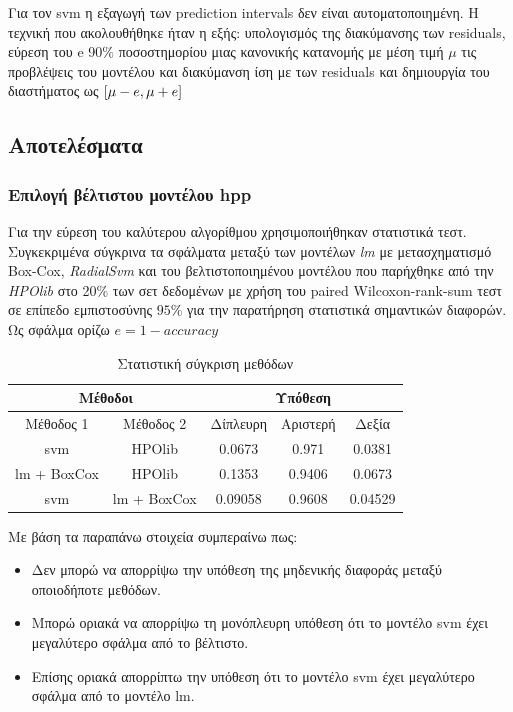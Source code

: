 \documentclass[]{article}
\numberwithin{equation}{section}		%
\numberwithin{figure}{section}			%
\numberwithin{table}{section}				%
\begin{document}
   Για τον svm η εξαγωγή των prediction intervals δεν είναι αυτοματοποιημένη. Η τεχνική που ακολουθήθηκε ήταν η εξής: υπολογισμός της διακύμανσης των residuals, εύρεση του e 90$\%$ ποσοστημορίου μιας κανονικής κατανομής με μέση τιμή $\mu$ τις προβλέψεις του μοντέλου και διακύμανση ίση με των residuals και δημιουργία του διαστήματος ως $ \interval{\mu - e}{\mu + e}$
   
   \subsection{Αποτελέσματα}
   \subsubsection{Επιλογή βέλτιστου μοντέλου \gls{hpp}}
   Για την εύρεση του καλύτερου αλγορίθμου χρησιμοποιήθηκαν στατιστικά τεστ. Συγκεκριμένα σύγκρινα τα σφάλματα μεταξύ των μοντέλων \textit{lm} με μετασχηματισμό Βox-Cox, \textit{RadialSvm} και του βελτιστοποιημένου μοντέλου που παρήχθηκε από την \textit{HPOlib} στο 20$\%$ των σετ δεδομένων με χρήση του paired Wilcoxon-rank-sum τεστ σε επίπεδο εμπιστοσύνης $95\%$ για την παρατήρηση στατιστικά σημαντικών διαφορών. Ως σφάλμα ορίζω $e = 1 - accuracy$
   
   \begin{table}[!htb]
   	\begin{center}
   		\begin{tabular}{*5c}
   			\toprule
   			\multicolumn{2}{c}{Μέθοδοι} & \multicolumn{3}{c}{Υπόθεση} \\ 
   			\midrule
   			Μέθοδος 1 & Μέθοδος 2 & Δίπλευρη & Αριστερή & Δεξία\\
   			\midrule
   			svm & HPOlib & 0.0673 & 0.971 & 0.0381 \\
   			lm + BoxCox & HPOlib & 0.1353 & 0.9406 & 0.0673 \\
   			svm & lm + BoxCox & 0.09058 & 0.9608 & 0.04529 \\
   			\midrule   				
   		\end{tabular}    
   	\end{center}
   	\caption{Στατιστική σύγκριση μεθόδων}\label{mfs}
   \end{table}
   
   Με βάση τα παραπάνω στοιχεία συμπεραίνω πως:
   \begin{itemize}
   	\item Δεν μπορώ να απορρίψω την υπόθεση της μηδενικής διαφοράς μεταξύ οποιοδήποτε μεθόδων.
   	\item Μπορώ οριακά να απορρίψω τη μονόπλευρη υπόθεση ότι το μοντέλο svm έχει μεγαλύτερο σφάλμα από το βέλτιστο.
   	\item Επίσης οριακά απορρίπτω την υπόθεση ότι το μοντέλο svm έχει μεγαλύτερο σφάλμα από το μοντέλο lm.
   \end{itemize}
   
\end{document}
